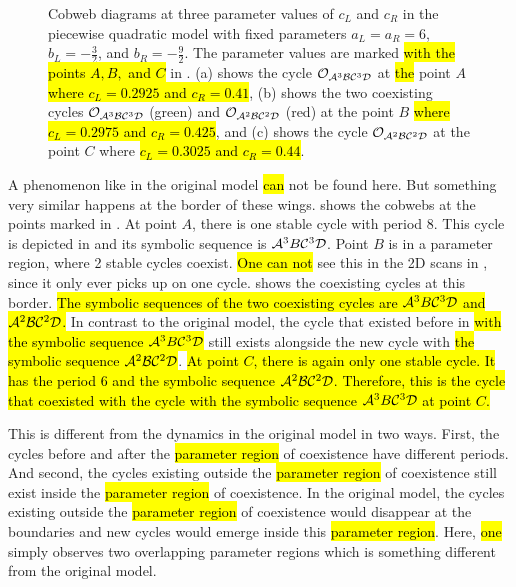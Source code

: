 \begin{figure}
	\centering
	\caption[Cobweb diagrams of the even quadratic model]{
		Cobweb diagrams at three parameter values of $c_L$ and $c_R$ in the piecewise quadratic model with fixed parameters $a_L = a_R = 6$, $b_L = -\frac{3}{2}$, and $b_R = -\frac{9}{2}$.
		The parameter values are marked \hl{with the points $A, B,$ and $C$} in .
		(a) shows the cycle $\mathcal{O}_{\mathcal{A}^3\mathcal{B}\mathcal{C}^3\mathcal{D}}$ at \hl{the} point $A$ \hl{where $c_L = 0.2925$ and $c_R = 0.41$},
		(b) shows the two coexisting cycles $\mathcal{O}_{\mathcal{A}^3\mathcal{B}\mathcal{C}^3\mathcal{D}}$ (green) and $\mathcal{O}_{\mathcal{A}^2\mathcal{B}\mathcal{C}^2\mathcal{D}}$ (red) at the point $B$ \hl{where $c_L = 0.2975$ and $c_R = 0.425$},
		and (c) shows the cycle $\mathcal{O}_{\mathcal{A}^2\mathcal{B}\mathcal{C}^2\mathcal{D}}$ at the point $C$ where \hl{$c_L = 0.3025$ and $c_R = 0.44$}.
	}
	\label{fig:setup.quad.even.cobwebs}
\end{figure}

A phenomenon like in the original model \hl{can} not be found here.
But something very similar happens at the border of these wings.
 shows the cobwebs at the points marked in .
At point $A$, there is one stable cycle with period $8$.
This cycle is depicted in  and its symbolic sequence is $\mathcal{A}^3B\mathcal{C}^3\mathcal{D}$.
Point $B$ is in a parameter region, where 2 stable cycles coexist.
\hl{One can not} see this in the 2D scans in , since it only ever picks up on one cycle.
 shows the coexisting cycles at this border.
\hl{
	The symbolic sequences of the two coexisting cycles are $\mathcal{A}^3B\mathcal{C}^3\mathcal{D}$ and $\mathcal{A}^2\mathcal{B}\mathcal{C}^2\mathcal{D}$.
}
In contrast to the original model, the cycle that existed before in  \hl{with the symbolic sequence $\mathcal{A}^3B\mathcal{C}^3\mathcal{D}$} still exists alongside the new cycle with \hl{the symbolic sequence $\mathcal{A}^2\mathcal{B}\mathcal{C}^2\mathcal{D}$}.
\hl{
	At point $C$, there is again only one stable cycle.
	It has the period $6$ and the symbolic sequence $\mathcal{A}^2\mathcal{B}\mathcal{C}^2\mathcal{D}$.
	Therefore, this is the cycle that coexisted with the cycle with the symbolic sequence $\mathcal{A}^3B\mathcal{C}^3\mathcal{D}$ at point $C$.
}

This is different from the dynamics in the original model in two ways.
First, the cycles before and after the \hl{parameter region} of coexistence have different periods.
And second, the cycles existing outside the \hl{parameter region} of coexistence still exist inside the \hl{parameter region} of coexistence.
In the original model, the cycles existing outside the \hl{parameter region} of coexistence would disappear at the boundaries and new cycles would emerge inside this \hl{parameter region}.
Here, \hl{one} simply observes two overlapping parameter regions which is something different from the original model.
